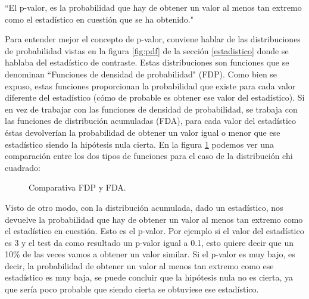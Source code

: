 \begin{center}
``El p-valor, es la probabilidad que hay de obtener un valor al menos tan extremo como el estadístico en cuestión
que se ha obtenido."
\end{center}

Para entender mejor el concepto de p-valor, conviene hablar de las distribuciones de probabilidad vistas en la
figura \ref{fig:pdf} de la sección \ref{estadistico} donde se hablaba del estadístico de contraste. Estas
distribuciones son funciones que se denominan ``Funciones de densidad de probabilidad" (FDP). Como bien se
expuso, estas funciones proporcionan la probabilidad que existe para cada valor diferente del estadístico (cómo
de probable es obtener ese valor del estadístico). Si en vez de trabajar con las funciones de densidad de 
probabilidad, se trabaja con las funciones de distribución acumuladas (FDA), para cada valor del estadístico
éstas devolverían la probabilidad de obtener un valor igual o menor que ese estadístico siendo la hipótesis nula
cierta. En la figura \ref{fig:comparativa_pdf_cdf} podemos ver una comparación entre los dos tipos de funciones
para el caso de la distribución chi cuadrado:

\begin{figure}[h]
\centering
{}
\caption{Comparativa FDP y FDA.}
\label{fig:comparativa_pdf_cdf}
\end{figure}

Visto de otro modo, con la distribución acumulada, dado un estadístico, nos devuelve la probabilidad que hay de
obtener un valor al menos tan extremo como el estadístico en cuestión. Esto es el p-valor. Por ejemplo si el valor
del estadístico es 3 y el test da como resultado un p-valor igual a 0.1, esto quiere decir que un 10\% de las veces
vamos a obtener un valor similar. Si el p-valor es muy bajo, es decir, la probabilidad de obtener un valor al menos
tan extremo como ese estadístico es muy baja, se puede concluir que la hipótesis nula no es cierta, ya que sería
poco probable que siendo cierta se obtuviese ese estadístico.

